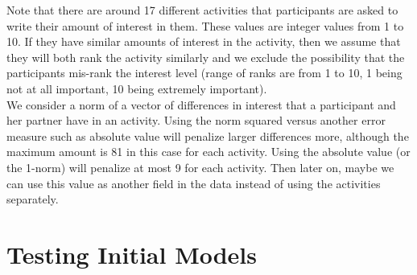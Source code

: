 \documentclass{article}
\begin{document}
Note that there are around 17 different activities that participants are asked to 
write their amount of interest in them.  These values are integer values from 1 to 10.  If they have similar amounts of interest in the activity, then we assume that they will both rank the activity similarly and we exclude the possibility that the participants mis-rank the interest level (range of ranks are from 1 to 10, 1 being not at all important, 10 being extremely important).\\

We consider a norm of a vector of differences in interest that a participant and her partner have in an activity.  Using the norm squared versus another error measure such as absolute value will penalize larger differences more, although the maximum amount is 81 in this case for each activity. Using the absolute value (or the 1-norm) will penalize at most 9 for each activity. Then later on, maybe we can use this value as another field in the data instead of using the activities separately. \\
 
 \section{Testing Initial Models}
 
\end{document}

